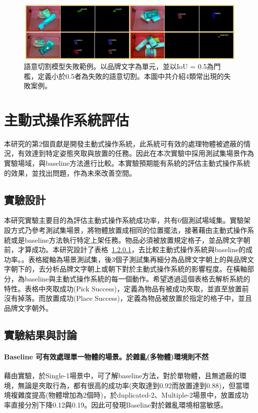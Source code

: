 \begin{figure}[ht]
	\centering
	\includegraphics[height=!, width=0.8\linewidth, keepaspectratio=true]
	{./figures/failure_case.jpg}
  \caption{語意切割模型失敗範例。以品牌文字為單元，並以IoU = 0.5為門檻，定義小於0.5者為失敗的語意切割。本圖中共介紹4類常出現的失敗案例。}
  \label{figure:failure_case}
\end{figure}

\section{主動式操作系統評估}

本研究的第2個貢獻是開發主動式操作系統，此系統可有效的處理物體被遮蔽的情況，有效達到特定姿態夾取與放置的任務。因此在本次實驗中採用測試集場景作為實驗場域，與baseline方法進行比較。本實驗預期能有系統的評估主動式操作系統的效果，並找出問題，作為未來改善空間。

\subsection{實驗設計}
本研究實驗主要目的為評估主動式操作系統成功率，共有6個測試場域集。實驗架設方式乃參考測試集場景，將物體放置成相同的位置擺法，接著藉由主動式操作系統或是baseline方法執行特定上架任務。物品必須被放置規定格子，並品牌文字朝前，才算成功。本研究設計了表格~\ref{}，去比較主動式操作系統與baseline的成功率。。表格縱軸為場景測試集，後3個子測試集再細分為品牌文字朝上的與品牌文字朝下的，去分析品牌文字朝上或朝下對於主動式操作系統的影響程度。在橫軸部分，為baseline與主動式操作系統的每一個動作。希望透過這個表格去解析系統的特性。表格中夾取成功(Pick Success)，定義為物品有被成功夾取，並直至放置前沒有掉落。而放置成功(Place Success)，定義為物品被放置於指定的格子中，並且品牌文字朝外。

\subsection{實驗結果與討論}

\paragraph{Baseline 可有效處理單一物體的場景。於雜亂(多物體)環境則不然}
藉由實驗，於Single-1場景中，可了解baseline方法，對於單物體，且無遮蔽的環境，無論是夾取行為，都有很高的成功率(夾取達到0.92而放置達到0.88)，但當環境複雜度提高(物體增加為2個時)，於duplicated-2、Multiple-2場景中，放置成功率直接分別下降0.12與0.19。因此可發現Baseline對於雜亂環境相當敏感。

